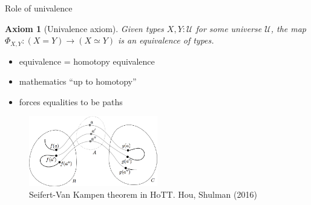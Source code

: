 \documentclass[english]{beamer}
\newtheorem{axiom}[theorem]{Axiom}
\begin{document}
\begin{frame}{Role of univalence}

\begin{axiom}[Univalence axiom] 
 Given types $X,Y : \mathcal{U}$ for some universe $\mathcal{U}$, the map \(\Phi_{X,Y}: (X=Y) \rightarrow (X \simeq Y)\) is an equivalence of types. 
\end{axiom}

\begin{itemize}
 \item equivalence = homotopy equivalence
 \item mathematics ``up to homotopy''
 \item forces equalities to be paths
\end{itemize}
 


\begin{figure}[h!]
\centering    
\includegraphics[width=0.5\textwidth]{figures/seifert.png}
  \caption{Seifert-Van Kampen theorem in HoTT. Hou, Shulman (2016)}
 \end{figure} 




\end{frame}
\end{document}
